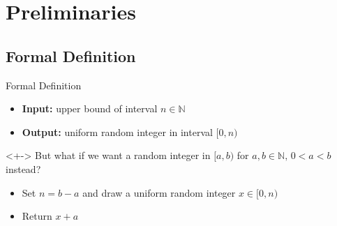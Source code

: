 \section{Preliminaries}

\subsection{Formal Definition}
\begin{frame}{Formal Definition}
    \pause
    \begin{itemize}[<+->]
        \item \textbf{Input:} upper bound of interval $n \in \mathbb{N}$
        \item \textbf{Output:} uniform random integer in interval $[0,n)$
    \end{itemize}

    \vspace*{0.5cm}

    \begin{alertblock}{}<+->
        \centering
        But what if we want a random integer in $[a,b)$ for $a,b \in \mathbb{N},\,0 < a < b$ instead?
    \end{alertblock}

    \smallskip

    \begin{itemize}[<+->]
        \item Set $n = b - a$ and draw a uniform random integer $x \in [0,n)$
        \item Return $x + a$
    \end{itemize}
\end{frame}



